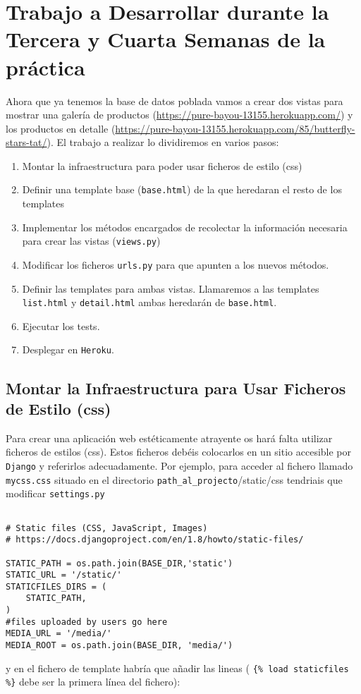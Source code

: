 \documentclass[12pt]{article} %
\newcommand{\herokuurl}[1]{\url{https://pure-bayou-13155.herokuapp.com/#1}}%
\newcommand{\hhh}[1]{\texttt{#1}}%
\newcommand{\views}{\texttt{views.py}}%
\newcommand{\urls}{\texttt{urls.py}}%
\newcommand{\django}{\texttt{Django}}%
\newcommand{\heroku}{\texttt{Heroku}}
\begin{document}
\section{Trabajo a Desarrollar durante la Tercera y Cuarta Semanas de la práctica} %

Ahora que ya tenemos la base de datos poblada vamos a crear dos vistas para mostrar una galería de productos (\herokuurl{}) y los productos en detalle (\herokuurl{85/butterfly-stars-tat/}). El trabajo a realizar lo dividiremos en varios pasos:

\begin{enumerate}
 \item Montar la infraestructura para poder usar ficheros de estilo (css)
 \item Definir una template base (\hhh{base.html}) de la que heredaran el resto de los templates
 \item Implementar los métodos encargados de recolectar la información necesaria para crear las vistas (\views)
 \item Modificar los ficheros \urls{} para que apunten a los nuevos métodos.
 \item Definir las templates para ambas vistas. Llamaremos a las templates \hhh{list.html} y \hhh{detail.html} ambas heredarán de \hhh{base.html}.
 \item Ejecutar los tests.
 \item Desplegar en \heroku.
 
\end{enumerate}

\subsection{Montar la Infraestructura para Usar Ficheros de Estilo (css)}

Para crear una aplicación web estéticamente atrayente os hará falta utilizar ficheros de estilos (css). Estos ficheros debéis colocarlos en un sitio accesible por \django{} y referirlos adecuadamente. Por ejemplo, para acceder al fichero llamado \texttt{mycss.css} situado en el directorio \texttt{path\_al\_projecto}/static/css tendriais que modificar \texttt{settings.py}

\begin{lstlisting}[label={settings}]

# Static files (CSS, JavaScript, Images)
# https://docs.djangoproject.com/en/1.8/howto/static-files/

STATIC_PATH = os.path.join(BASE_DIR,'static')
STATIC_URL = '/static/'
STATICFILES_DIRS = (
    STATIC_PATH,
)
#files uploaded by users go here
MEDIA_URL = '/media/'
MEDIA_ROOT = os.path.join(BASE_DIR, 'media/')

\end{lstlisting}
y en el fichero de template habría que añadir las lineas ( \texttt{\{\% load  staticfiles \%\}} debe ser la primera línea del fichero):
\end{document}

